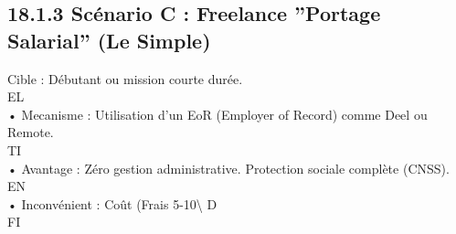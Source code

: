 \documentclass[12pt,landscape,a4paper]{article}
\begin{document}
\subsection{18.1.3 Scénario C : Freelance ”Portage Salarial” (Le Simple)}
Cible : Débutant ou mission courte durée.\\
\vspace{0.5em}
\vspace{0.5em}
\vspace{0.5em}
\vspace{0.5em}
EL\\
• Mecanisme : Utilisation d’un EoR (Employer of Record) comme Deel ou Remote.\\
\vspace{0.5em}
\vspace{0.5em}
\vspace{0.5em}
\vspace{0.5em}
TI\\
• Avantage : Zéro gestion administrative. Protection sociale complète (CNSS).\\
\vspace{0.5em}
\vspace{0.5em}
\vspace{0.5em}
\vspace{0.5em}
EN\\
• Inconvénient : Coût (Frais 5-10\textbackslash{}%
\vspace{0.5em}
\vspace{0.5em}
\vspace{0.5em}
\vspace{0.5em}
D\\
FI\\
\end{document}
